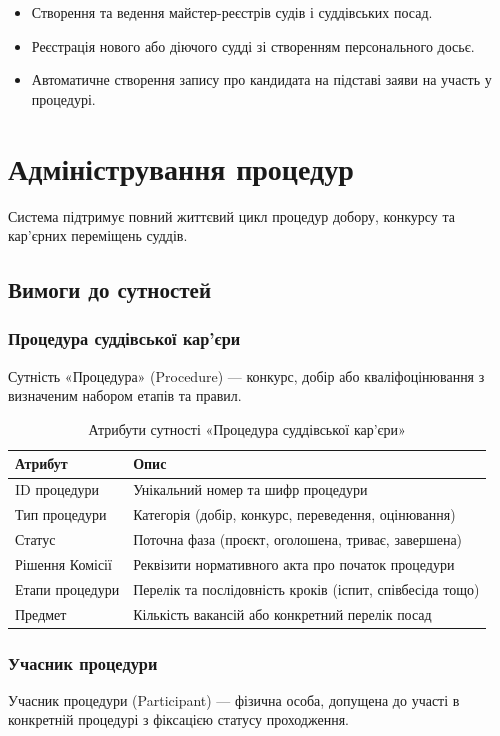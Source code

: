 \documentclass{article}
\begin{document}
\begin{itemize}
\item Створення та ведення майстер-реєстрів судів і суддівських посад.
\item Реєстрація нового або діючого судді зі створенням персонального досьє.
\item Автоматичне створення запису про кандидата на підставі заяви на участь у процедурі.
\end{itemize}

\newpage
\section{Адміністрування процедур}

Система підтримує повний життєвий цикл процедур добору, конкурсу та кар’єрних переміщень суддів.

\subsection{Вимоги до сутностей}

\subsubsection{Процедура суддівської кар'єри}
Сутність «Процедура» (Procedure) — конкурс, добір або кваліфоцінювання з визначеним набором етапів та правил.

\begin{table}[ht]
\caption{Атрибути сутності «Процедура суддівської кар'єри»}
\begin{tabular}{p{5cm}p{9cm}}
\hline
\textbf{Атрибут} & \textbf{Опис} \\
\hline
ID процедури & Унікальний номер та шифр процедури \\
Тип процедури & Категорія (добір, конкурс, переведення, оцінювання) \\
Статус & Поточна фаза (проєкт, оголошена, триває, завершена) \\
Рішення Комісії & Реквізити нормативного акта про початок процедури \\
Етапи процедури & Перелік та послідовність кроків (іспит, співбесіда тощо) \\
Предмет & Кількість вакансій або конкретний перелік посад \\
\hline
\end{tabular}
\end{table}

\subsubsection{Учасник процедури}
Учасник процедури (Participant) — фізична особа, допущена до участі в конкретній процедурі з фіксацією статусу проходження.
\end{document}
